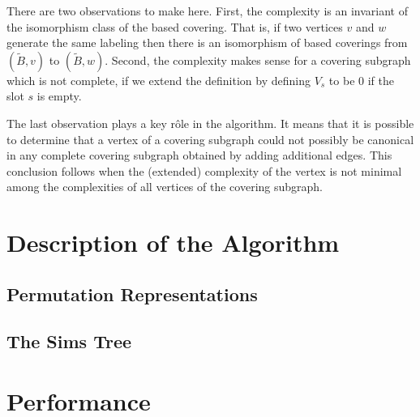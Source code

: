 \documentclass[12pt]{article}
\theoremstyle{definition}
\renewcommand{\tilde}{\widetilde}
\begin{document}
   There are two observations to make here.  First, the complexity is an
   invariant of the isomorphism class of the based covering.  That is, if two
   vertices $v$ and $w$ generate the same labeling then there is an isomorphism
   of based coverings from $(\tilde B, v)$ to $(\tilde B, w)$.  Second, the
   complexity makes sense for a covering subgraph which is not complete,
   if we extend the definition by defining $V_s$ to be $0$ if the slot $s$ is empty.

   The last observation plays a key r\^ole in the algorithm.  It means that it
   is possible to determine that a vertex of a covering subgraph could not
   possibly be canonical in any complete covering subgraph obtained by adding
   additional edges.  This conclusion follows when the (extended) complexity of
   the vertex is not minimal among the complexities of all vertices of the
   covering subgraph.
   
\section{Description of the Algorithm}
   \subsection{Permutation Representations}
   \subsection{The Sims Tree}

\section{Performance}

\begin{bibdiv}
\begin{biblist}
 \end{biblist}
\end{bibdiv}
\end{document}
